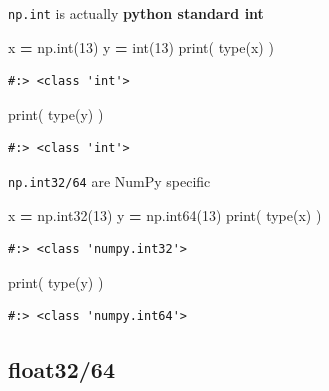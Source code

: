 \documentclass[
]{book}
\newenvironment{Shaded}{\begin{snugshade}}{\end{snugshade}}
\newcommand{\BuiltInTok}[1]{#1}
\newcommand{\DecValTok}[1]{\textcolor[rgb]{0.06,0.06,0.06}{#1}}
\newcommand{\NormalTok}[1]{#1}
\newcommand{\OperatorTok}[1]{\textcolor[rgb]{0.43,0.43,0.43}{\textbf{#1}}}
\begin{document}
\texttt{np.int} is actually \textbf{python standard int}

\begin{Shaded}
\begin{Highlighting}[]
\NormalTok{x }\OperatorTok{=}\NormalTok{ np.}\BuiltInTok{int}\NormalTok{(}\DecValTok{13}\NormalTok{)}
\NormalTok{y }\OperatorTok{=} \BuiltInTok{int}\NormalTok{(}\DecValTok{13}\NormalTok{)}
\BuiltInTok{print}\NormalTok{( }\BuiltInTok{type}\NormalTok{(x) )}
\end{Highlighting}
\end{Shaded}

\begin{verbatim}
#:> <class 'int'>
\end{verbatim}

\begin{Shaded}
\begin{Highlighting}[]
\BuiltInTok{print}\NormalTok{( }\BuiltInTok{type}\NormalTok{(y) )}
\end{Highlighting}
\end{Shaded}

\begin{verbatim}
#:> <class 'int'>
\end{verbatim}

\texttt{np.int32/64} are NumPy specific

\begin{Shaded}
\begin{Highlighting}[]
\NormalTok{x }\OperatorTok{=}\NormalTok{ np.int32(}\DecValTok{13}\NormalTok{)}
\NormalTok{y }\OperatorTok{=}\NormalTok{ np.int64(}\DecValTok{13}\NormalTok{)}
\BuiltInTok{print}\NormalTok{( }\BuiltInTok{type}\NormalTok{(x) )}
\end{Highlighting}
\end{Shaded}

\begin{verbatim}
#:> <class 'numpy.int32'>
\end{verbatim}

\begin{Shaded}
\begin{Highlighting}[]
\BuiltInTok{print}\NormalTok{( }\BuiltInTok{type}\NormalTok{(y) )}
\end{Highlighting}
\end{Shaded}

\begin{verbatim}
#:> <class 'numpy.int64'>
\end{verbatim}

\hypertarget{float3264}{%
\subsection{float32/64}\label{float3264}}
\end{document}
